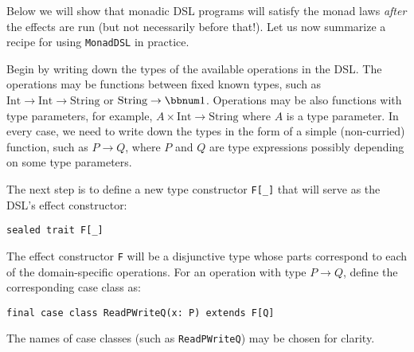 Below we will show that monadic DSL programs will satisfy the monad
laws \emph{after} the effects are run (but not necessarily before
that!). Let us now summarize a recipe for using \lstinline!MonadDSL!
in practice.

Begin by writing down the types of the available operations in the
DSL. The operations may be functions between fixed known types, such
as $\text{Int}\rightarrow\text{Int}\rightarrow\text{String}$ or $\text{String}\rightarrow\bbnum 1$.
Operations may be also functions with type parameters, for example,
$A\times\text{Int}\rightarrow\text{String}$ where $A$ is a type
parameter. In every case, we need to write down the types in the form
of a simple (non-curried) function, such as $P\rightarrow Q$, where
$P$ and $Q$ are type expressions possibly depending on some type
parameters.

The next step is to define a new type constructor \lstinline!F[_]!
that will serve as the DSL\textsf{'}s effect constructor:
\begin{lstlisting}
sealed trait F[_]
\end{lstlisting}
 The effect constructor \lstinline!F!
will be a disjunctive type whose parts correspond to each of the domain-specific
operations. For an operation with type $P\rightarrow Q$, define the
corresponding case class as:
\begin{lstlisting}
final case class ReadPWriteQ(x: P) extends F[Q]
\end{lstlisting}
The names of case classes (such as \lstinline!ReadPWriteQ!)
may be chosen for clarity.

